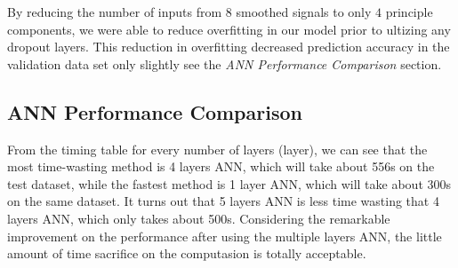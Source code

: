 \documentclass{article}
\begin{document}
By reducing the number of inputs from $8$ smoothed signals to only $4$ principle components, we were able to reduce overfitting in our model prior to ultizing any dropout layers. This reduction in overfitting decreased prediction accuracy in the validation data set only slightly see the \textit{ANN Performance Comparison} section.


\subsection{ANN Performance Comparison}


\begin{center}

From the timing table for every number of layers (layer), we can see that the most time-wasting method is 4 layers ANN, which will take about 556s on the test dataset, while the fastest method is 1 layer ANN, which will take about 300s on the same dataset. It turns out that 5 layers ANN is less time wasting that 4 layers ANN, which only takes about 500s. Considering the remarkable improvement on the performance after using the multiple layers ANN, the little amount of time sacrifice on the computasion is totally acceptable. 
  
\end{center}



\newpage







\end{document}
